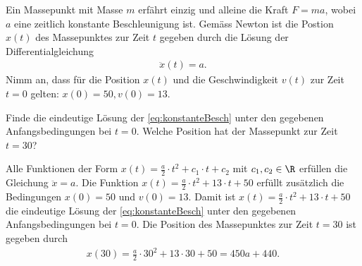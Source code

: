 \begin{myexercise}
Ein Massepunkt mit Masse $m$ erfährt einzig und alleine die Kraft $F = ma$, wobei $a$ eine zeitlich konstante Beschleunigung ist. Gemäss Newton ist die Postion $x(t)$ des Massepunktes zur Zeit $t$ gegeben durch die Lösung der Differentialgleichung
\begin{align}\label{eq:konstanteBesch}
  \ddot{x}(t) = a.
\end{align}
Nimm an, dass für die Position $x(t)$ und die Geschwindigkeit $v(t)$ zur Zeit $t=0$ gelten: $x(0) = 50, v(0) = 13$.

Finde die eindeutige Lösung der \cref{eq:konstanteBesch} unter den gegebenen Anfangsbedingungen bei $t = 0$. Welche Position hat der Massepunkt zur Zeit $t = 30$?
\begin{myanswer}
Alle Funktionen der Form $x(t) = \frac{a}{2}\cdot t^2 + c_1\cdot t + c_2$ mit $c_1,c_2\in\R$ erfüllen die Gleichung $\ddot{x} = a$.
Die Funktion $x(t) = \frac{a}{2}\cdot t^2 + 13\cdot t + 50$ erfüllt zusätzlich die Bedingungen $x(0) = 50$ und $v(0) = 13$. Damit ist $x(t) = \frac{a}{2}\cdot t^2 + 13\cdot t + 50$ die eindeutige Lösung der \cref{eq:konstanteBesch} unter den gegebenen Anfangsbedingungen bei $t = 0$.
Die Position des Massepunktes zur Zeit $t = 30$ ist gegeben durch
\begin{align*}
  x(30) = \frac{a}{2}\cdot 30^2 + 13\cdot 30 + 50 = 450a + 440. 
\end{align*}
\end{myanswer}
\end{myexercise}